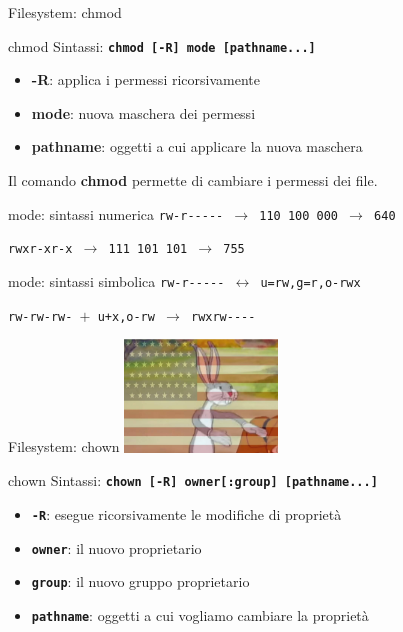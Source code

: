 \documentclass{beamer}
\begin{document}
    \begin{frame}{Filesystem: chmod}
        \begin{block}{chmod}
            Sintassi: \texttt{\textbf{chmod [-R] mode [pathname...]}}

            \begin{itemize}
                \item \textbf{-R}: applica i permessi ricorsivamente
                \item \textbf{mode}: nuova maschera dei permessi
                \item \textbf{pathname}: oggetti a cui applicare la nuova maschera
            \end{itemize}

            Il comando \textbf{chmod} permette di cambiare i permessi dei file.
        \end{block}

        \begin{alertblock}{mode: sintassi numerica}
            \texttt{rw-r-{}-{}-{}-{}- $\rightarrow$ 110 100 000 $\rightarrow$ 640}

            \texttt{rwxr-xr-x $\rightarrow$ 111 101 101 $\rightarrow$ 755}
        \end{alertblock}

        \begin{alertblock}{mode: sintassi simbolica}
            \texttt{rw-r-{}-{}-{}-{}- $\leftrightarrow$ u=rw,g=r,o-rwx}
        
            \texttt{rw-rw-rw- $+$ u+x,o-rw $\rightarrow$ rwxrw-{}-{}-{}-}
        \end{alertblock}
    \end{frame}

    \begin{frame}{Filesystem: chown}
        \centering
        \includegraphics[height=3cm, keepaspectratio]{images/bugs-bunny-capitalist.png}
        \begin{block}{chown}
            Sintassi: \texttt{\textbf{chown [-R] owner[:group] [pathname...]}}

            \begin{itemize}
                \item \texttt{\textbf{-R}}: esegue ricorsivamente le modifiche di proprietà
                \item \texttt{\textbf{owner}}: il nuovo proprietario
                \item \texttt{\textbf{group}}: il nuovo gruppo proprietario
                \item \texttt{\textbf{pathname}}: oggetti a cui vogliamo cambiare la proprietà
            \end{itemize}
        \end{block}
    \end{frame}
\end{document}
